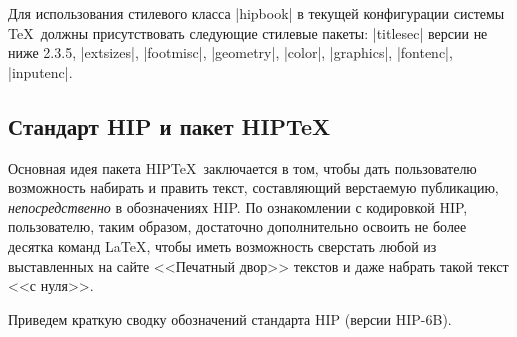\documentclass{ltxguide}
\begin{document}
Для использования стилевого класса |hipbook| в текущей конфигурации
системы \TeX\ должны присутствовать следующие стилевые пакеты:
|titlesec| версии не ниже 2.3.5, |extsizes|, |footmisc|, |geometry|,
|color|, |graphics|, |fontenc|, |inputenc|.

\subsection{Стандарт HIP и пакет HIP\TeX}\label{sec:hip}

Основная идея пакета HIP\TeX\ заключается в том, чтобы дать
пользователю возможность набирать и править текст, составляющий
верстаемую публикацию, {\em непосредственно} в обозначениях HIP. По
ознакомлении с кодировкой HIP, пользователю, таким образом, достаточно
дополнительно освоить не более десятка команд \LaTeX, чтобы иметь
возможность сверстать любой из выставленных на сайте <<Печатный двор>>
текстов и даже набрать такой текст <<с нуля>>.

Приведем краткую сводку обозначений стандарта HIP (версии HIP-6B).
\end{document}
